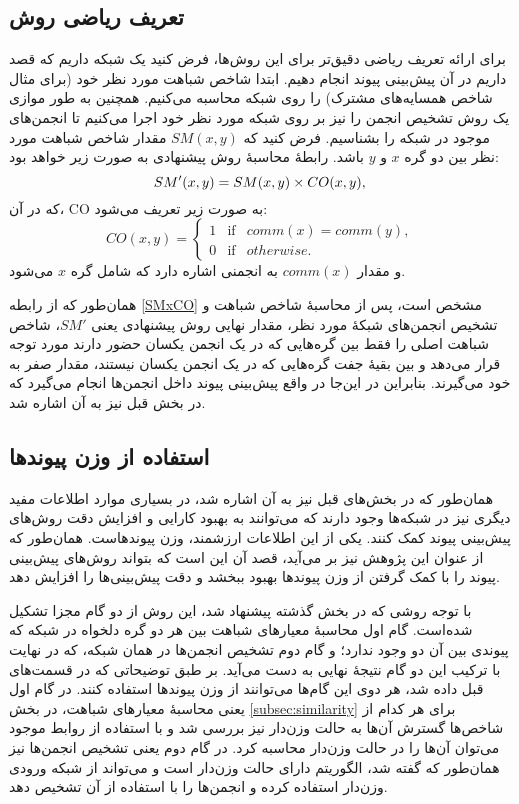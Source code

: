 \subsection{تعریف ریاضی روش}
برای ارائه تعریف ریاضی دقیق‌تر برای این روش‌ها، فرض کنید یک شبکه داریم که قصد داریم در آن پیش‌بینی پیوند انجام دهیم. ابتدا شاخص شباهت مورد نظر خود (برای مثال شاخص همسایه‌های مشترک) را روی شبکه محاسبه می‌کنیم. همچنین به طور موازی یک روش تشخیص انجمن را نیز بر روی شبکه مورد نظر خود اجرا می‌کنیم تا انجمن‌های موجود در شبکه را بشناسیم. فرض کنید که $SM(x,y)$ مقدار شاخص شباهت مورد نظر بین دو گره $x$ و $y$ باشد. رابطهٔ محاسبهٔ روش پیشنهادی به صورت زیر خواهد بود:
\begin{equation}\label{SMxCO}
  SM'(x,y)=SM(x,y) \times CO(x,y),\\
\end{equation}
که در آن، CO به صورت زیر تعریف می‌شود:
\begin{equation}
  CO(x,y)=  \left\{
              \begin{array}{rcl}
                1 & \text{if} & comm(x) = comm(y) ,\\
                0 & \text{if} & otherwise.
              \end{array} \right.
\end{equation}
و مقدار $comm(x)$ به انجمنی اشاره دارد که شامل گره $x$ می‌شود.

همان‌طور که از رابطه \ref{SMxCO} مشخص است، پس از محاسبهٔ شاخص شباهت و تشخیص انجمن‌های شبکهٔ مورد نظر، مقدار نهایی روش پیشنهادی یعنی $SM'$، شاخص شباهت اصلی را فقط بین گره‌هایی که در یک انجمن یکسان حضور دارند مورد توجه قرار می‌دهد و بین بقیهٔ جفت گره‌هایی که در یک انجمن یکسان نیستند، مقدار صفر به خود می‌گیرند. بنابراین در این‌جا در واقع پیش‌بینی پیوند داخل انجمن‌ها انجام می‌گیرد که در بخش قبل  نیز به آن اشاره شد.

\subsection{استفاده از وزن پیوندها}
همان‌طور که در بخش‌های قبل نیز به آن اشاره شد، در بسیاری موارد اطلاعات مفید دیگری نیز در شبکه‌ها وجود دارند که می‌توانند به بهبود کارایی و افزایش دقت روش‌های پیش‌بینی پیوند کمک کنند. یکی از این اطلاعات ارزشمند، وزن پیوندهاست. همان‌طور که از عنوان این پژوهش نیز بر می‌آید، قصد آن این است که بتواند روش‌های پیش‌بینی پیوند را با کمک گرفتن از وزن پیوندها بهبود ببخشد و دقت پیش‌بینی‌ها را افزایش دهد.

با توجه روشی که در بخش گذشته پیشنهاد شد، این روش از دو گام مجزا تشکیل شده‌است. گام اول محاسبهٔ معیارهای شباهت بین هر دو گره دلخواه در شبکه که پیوندی بین آن دو وجود ندارد؛ و گام دوم تشخیص انجمن‌ها در همان شبکه، که در نهایت با ترکیب این دو گام نتیجهٔ نهایی به دست می‌آید. بر طبق توضیحاتی که در قسمت‌های قبل داده شد، هر دوی این گام‌ها می‌توانند از وزن پیوندها استفاده کنند. در گام اول یعنی محاسبهٔ معیارهای شباهت، در بخش \ref{subsec:similarity} برای هر کدام از شاخص‌ها گسترش آن‌ها به حالت وزن‌دار نیز بررسی شد و با استفاده از روابط موجود می‌توان آن‌ها را در حالت وزن‌دار محاسبه کرد. در گام دوم یعنی تشخیص انجمن‌ها نیز همان‌طور که گفته شد، الگوریتم \Infomap دارای حالت وزن‌دار است و می‌تواند از شبکه ورودی وزن‌دار استفاده کرده و انجمن‌ها را با استفاده از آن تشخیص دهد.

